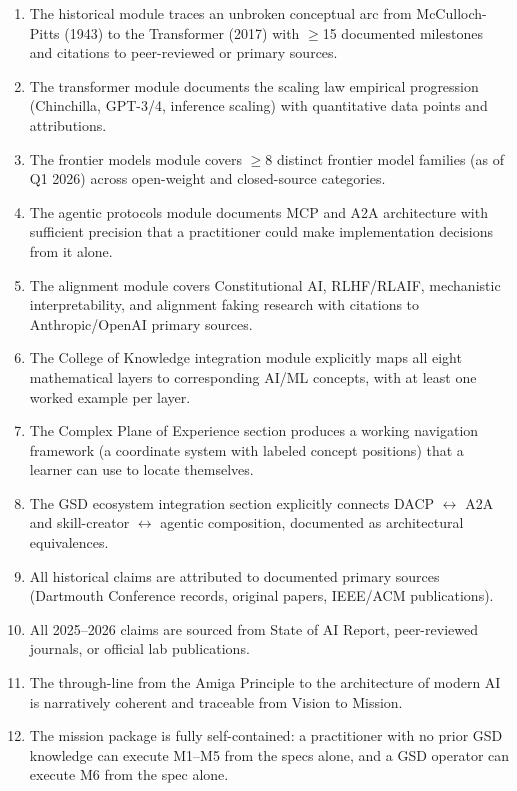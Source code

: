 \documentclass[11pt,letterpaper]{article}
\begin{document}
\begin{enumerate}[leftmargin=*, label=\textbf{SC-\arabic*:}]
\item The historical module traces an unbroken conceptual arc from McCulloch-Pitts (1943) to the Transformer (2017) with $\geq$15 documented milestones and citations to peer-reviewed or primary sources.
\item The transformer module documents the scaling law empirical progression (Chinchilla, GPT-3/4, inference scaling) with quantitative data points and attributions.
\item The frontier models module covers $\geq$8 distinct frontier model families (as of Q1 2026) across open-weight and closed-source categories.
\item The agentic protocols module documents MCP and A2A architecture with sufficient precision that a practitioner could make implementation decisions from it alone.
\item The alignment module covers Constitutional AI, RLHF/RLAIF, mechanistic interpretability, and alignment faking research with citations to Anthropic/OpenAI primary sources.
\item The College of Knowledge integration module explicitly maps all eight mathematical layers to corresponding AI/ML concepts, with at least one worked example per layer.
\item The Complex Plane of Experience section produces a working navigation framework (a coordinate system with labeled concept positions) that a learner can use to locate themselves.
\item The GSD ecosystem integration section explicitly connects DACP $\leftrightarrow$ A2A and skill-creator $\leftrightarrow$ agentic composition, documented as architectural equivalences.
\item All historical claims are attributed to documented primary sources (Dartmouth Conference records, original papers, IEEE/ACM publications).
\item All 2025--2026 claims are sourced from State of AI Report, peer-reviewed journals, or official lab publications.
\item The through-line from the Amiga Principle to the architecture of modern AI is narratively coherent and traceable from Vision to Mission.
\item The mission package is fully self-contained: a practitioner with no prior GSD knowledge can execute M1--M5 from the specs alone, and a GSD operator can execute M6 from the spec alone.
\end{enumerate}
\end{document}
